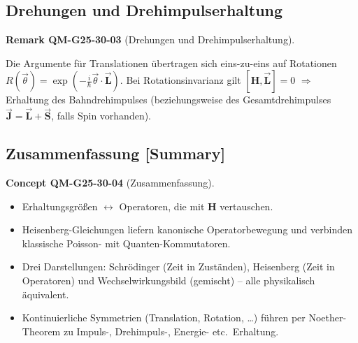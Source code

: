 \documentclass[10pt, letterpaper]{article}
\newcommand{\CustomHeading}[3]{%
  \par\medskip\noindent%
  \textbf{#1 #2} \textnormal{(#3)}.\enskip%
}
\newenvironment{REM}[2]{\begin{unitbox}\CustomHeading{Remark}{#1}{#2}}{\end{unitbox}}
\newenvironment{CONC}[2]{\begin{unitbox}\CustomHeading{Concept}{#1}{#2}}{\end{unitbox}}
\begin{document}

\subsection*{Drehungen und Drehimpulserhaltung}

\begin{REM}{QM-G25-30-03}{Drehungen und Drehimpulserhaltung}
Die Argumente für Translationen übertragen sich eins-zu-eins
auf Rotationen
$R(\vec\theta)=\exp(-\tfrac{i}{\hbar}\vec\theta\!\cdot\!\vec{\mathbf L})$.
Bei Rotationsinvarianz gilt
\(
  [\mathbf H,\vec{\mathbf L}]=0
\)
$\Rightarrow$ Erhaltung des Bahndrehimpulses
(beziehungsweise des Gesamtdrehimpulses
$\vec{\mathbf J}=\vec{\mathbf L}+\vec{\mathbf S}$, falls Spin vorhanden).
\end{REM}


\subsection*{Zusammenfassung [Summary]}

\begin{CONC}{QM-G25-30-04}{Zusammenfassung}
\begin{itemize}
\item Erhaltungsgrößen $\leftrightarrow$ Operatoren, die mit $\mathbf H$
      vertauschen.
\item Heisenberg-Gleichungen liefern kanonische Operatorbewegung
      und verbinden klassische Poisson- mit Quanten-Kommutatoren.
\item Drei Darstellungen:  
      Schrödinger (Zeit in Zuständen),  
      Heisenberg (Zeit in Operatoren)  
      und Wechselwirkungsbild (gemischt) – alle physikalisch äquivalent.
\item Kontinuierliche Symmetrien (Translation, Rotation, \dots)
      führen per Noether-Theorem zu Impuls-, Drehimpuls-, Energie-
      etc.\ Erhaltung.
\end{itemize}
\end{CONC}



\end{document}
